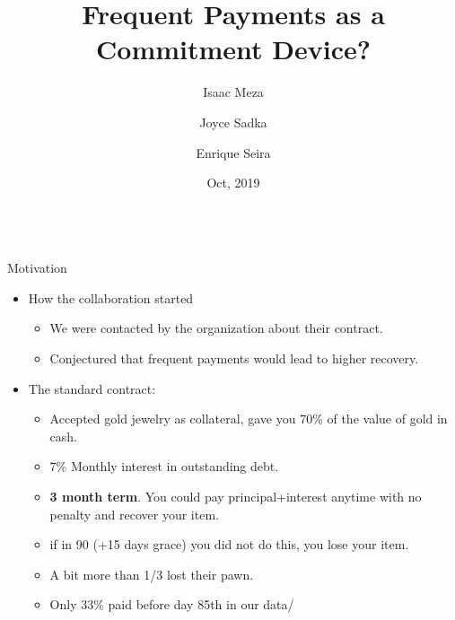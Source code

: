 \documentclass[9pt]{beamer}
\begin{document}
\title{Frequent Payments as a Commitment Device?}


\author[]{
Isaac Meza\and Joyce Sadka  \and Enrique Seira}



\date{Oct, 2019\\\;\;\\\;\;}


\begin{frame}[c, noframenumbering]%
\titlepage
\end{frame}


\begin{frame}{Motivation}
\begin{itemize}
\item How the collaboration started
    \begin{itemize}
        \item We were contacted by the organization about their contract.
        \item Conjectured that frequent payments would lead to higher recovery.
        
    \end{itemize}
    \pause
\vfill \item The standard contract:
    \begin{itemize}
        \item Accepted gold jewelry as collateral, gave you 70\% of the value of gold in cash.
        \item 7\% Monthly interest in outstanding debt.
        \item \textbf{3 month term}. You could pay principal+interest anytime with no penalty and recover your item. 
        \item if in 90 (+15 days grace) you did not do this, you lose your item.
        \item A bit more than 1/3 lost their pawn.
        \item Only 33\% paid before day 85th in our data/
    \end{itemize}
    \pause
    \end{itemize}

\vfill
\end{frame}
\end{document}
